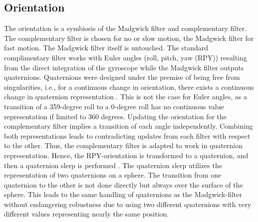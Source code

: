 \documentclass[letterpaper, 10 pt, conference]{ieeeconf}  %
\begin{document}
\subsection{Orientation}
The orientation is a symbiosis of the Madgwick filter and complementary filter. The complementary filter is chosen for no or slow motion, the Madgwick filter for fast motion. The Madgwick filter itself is untouched.
The standard complimentary filter works with Euler angles (roll, pitch, yaw (RPY)) resulting from the direct integration of the gyroscope while the Madgwick filter outputs quaternions.
Quaternions were designed under the premise of being free from singularities, i.e., for a continuous change in orientation, there exists a continuous change in quaternion representation \cite{becker2017dealing}. 
This is not the case for Euler angles, as a transition of a 359-degree roll to a 0-degree roll has no continuous value representation if limited to 360 degrees.
Updating the orientation for the complementary filter implies a transition of each angle independently.
Combining both representations leads to contradicting updates from each filter with respect to the other.
Thus, the complementary filter is adapted to work in quaternion representation.
Hence, the RPY-orientation is transformed to a quaternion, and then a quaternion slerp is performed \cite{dam1998quaternions}.
 The quaternion slerp utilizes the representation of two quaternions on a sphere. The transition from one quaternion to the other is not done directly but always over the surface of the sphere.
 This leads to the same handling of quaternions as the Madgwick-filter without endangering robustness due to using two different quaternions with very different values representing nearly the same position.
 
\end{document}
